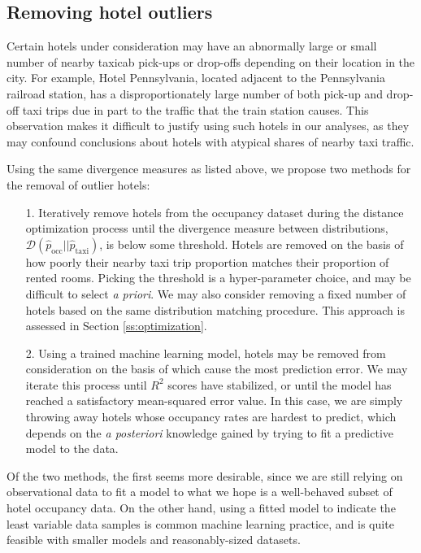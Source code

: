 \documentclass[useAMS, usenatbib]{biom}
\begin{document}
\subsection{Removing hotel outliers}
\label{ss:hotel_outliers}

Certain hotels under consideration may have an abnormally large or small number of nearby taxicab pick-ups or drop-offs depending on their location in the city. For example, Hotel Pennsylvania, located adjacent to the Pennsylvania railroad station, has a disproportionately large number of both pick-up and drop-off taxi trips due in part to the traffic that the train station causes. This observation makes it difficult to justify using such hotels in our analyses, as they may confound conclusions about hotels with atypical shares of nearby taxi traffic.

Using the same divergence measures as listed above, we propose two methods for the removal of outlier hotels:

\begin{itemize}

\item [1.] Iteratively remove hotels from the occupancy dataset during the distance optimization process until the divergence measure between distributions, $\mathcal{D} (\hat{p}_{\mathrm{occ}} || \hat{p}_{\mathrm{taxi}})$, is below some threshold. Hotels are removed on the basis of how poorly their nearby taxi trip proportion matches their proportion of rented rooms. Picking the threshold is a hyper-parameter choice, and may be difficult to select \textit{a priori}. We may also consider removing a fixed number of hotels based on the same distribution matching procedure. This approach is assessed in Section \ref{ss:optimization}.

\item [2.] Using a trained machine learning model, hotels may be removed from consideration on the basis of which cause the most prediction error. We may iterate this process until $R^2$ scores have stabilized, or until the model has reached a satisfactory mean-squared error value. In this case, we are simply throwing away hotels whose occupancy rates are hardest to predict, which depends on the \textit{a posteriori} knowledge gained by trying to fit a predictive model to the data.

\end{itemize}

Of the two methods, the first seems more desirable, since we are still relying on observational data to fit a model to what we hope is a well-behaved subset of hotel occupancy data. On the other hand, using a fitted model to indicate the least variable data samples is common machine learning practice, and is quite feasible with smaller models and reasonably-sized datasets.
\end{document}
